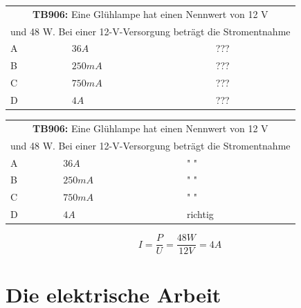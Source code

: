 \begin{frame}
	\begin{small}	
	\begin{tabular}{|l|l|l|}
	\hline
		\multicolumn{3}{|c|}{\textbf{TB906:} Eine Glühlampe hat einen Nennwert von 12 V }\\
		\multicolumn{3}{|c|}{und 48 W. Bei einer 12-V-Versorgung beträgt die Stromentnahme}\\
		\hline
		A & $36 A $ & ??? \\ \hline
		B & $250 mA $ & ??? \\ \hline
		C & $750 mA $ & ??? \\ \hline
		D & $4 A $ & ??? \\ \hline	
	\end{tabular}
	\end{small}
\end{frame}

\begin{frame}
	\begin{small}	
	\begin{tabular}{|l|l|l|}
	\hline
		\multicolumn{3}{|c|}{\textbf{TB906:} Eine Glühlampe hat einen Nennwert von 12 V }\\
		\multicolumn{3}{|c|}{und 48 W. Bei einer 12-V-Versorgung beträgt die Stromentnahme}\\
		\hline
		A & $36 A $ & " " \\ \hline
		B & $250 mA $ & " " \\ \hline
		C & $750 mA $ & " " \\ \hline
		D & $4 A $ & richtig \\ \hline	
	\end{tabular}
	\end{small}
	\vspace{1cm}
	\begin{equation}
		I = \frac{P}{U} = \frac{48W}{12V} = 4A
	\end{equation}
\end{frame}

\section{Die elektrische Arbeit}

